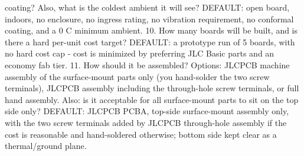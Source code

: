 \documentclass[11pt,a4paper]{article}
\begin{document}
coating? Also, what is the coldest ambient it will see? DEFAULT: open board, indoors, no enclosure, no ingress rating, no vibration requirement, no conformal coating, and a 0 C minimum ambient. 10. How many boards will be built, and is there a hard per-unit cost target? DEFAULT: a prototype run of 5 boards, with no hard cost cap - cost is minimized by preferring JLC Basic parts and an economy fab tier. 11. How should it be assembled? Options: JLCPCB machine assembly of the surface-mount parts only (you hand-solder the two screw terminals), JLCPCB assembly including the through-hole screw terminals, or full hand assembly. Also: is it acceptable for all surface-mount parts to sit on the top side only? DEFAULT: JLCPCB PCBA, top-side surface-mount assembly only, with the two screw terminals added by JLCPCB through-hole assembly if the cost is reasonable and hand-soldered otherwise; bottom side kept clear as a thermal/ground plane.
\end{document}

